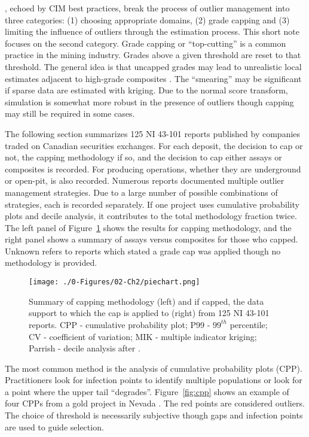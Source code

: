 \cite{leuangthong2015dealing}, echoed by CIM best practices, break the process of outlier management into three categories: (1) choosing appropriate domains, (2) grade capping and (3) limiting the influence of outliers through the estimation process. This short note focuses on the second category. Grade capping or ``top-cutting'' is a common practice in the mining industry. Grades above a given threshold are reset to that threshold. The general idea is that uncapped grades may lead to unrealistic local estimates adjacent to high-grade composites \citep{nowak2013suggestions}. The ``smearing'' may be significant if sparse data are estimated with kriging. Due to the normal score transform, simulation is somewhat more robust in the presence of outliers though capping may still be required in some cases.

The following section summarizes 125 NI 43-101 reports published by companies traded on Canadian securities exchanges. For each deposit, the decision to cap or not, the capping methodology if so, and the decision to cap either assays or composites is recorded. For producing operations, whether they are underground or open-pit, is also recorded. Numerous reports documented multiple outlier management strategies. Due to a large number of possible combinations of strategies, each is recorded separately. If one project uses cumulative probability plots and decile analysis, it contributes to the total methodology fraction twice. The left panel of Figure~\ref{fig:piechart} shows the results for capping methodology, and the right panel shows a summary of assays versus composites for those who capped. Unknown refers to reports which stated a grade cap was applied though no methodology is provided. 

\begin{figure}[htb!]
    \centering
    \texttt{[image: ./0-Figures/02-Ch2/piechart.png]}
    \caption{Summary of capping methodology (left) and if capped, the data support to which the cap is applied to (right) from 125 NI 43-101 reports. CPP - cumulative probability plot; P99 - $99^{th}$ percentile; CV - coefficient of variation; MIK - multiple indicator kriging; Parrish - decile analysis after \cite{parrish1997geologist}.}
    \label{fig:piechart}
\end{figure}

The most common method is the analysis of cumulative probability plots (CPP). Practitioners look for infection points to identify multiple populations or look for a point where the upper tail ``degrades''. Figure~\ref{fig:cpp} shows an example of four CPPs from a gold project in Nevada \citep{fiore2021}. The red points are considered outliers. The choice of threshold is necessarily subjective though gaps and infection points are used to guide selection.   

